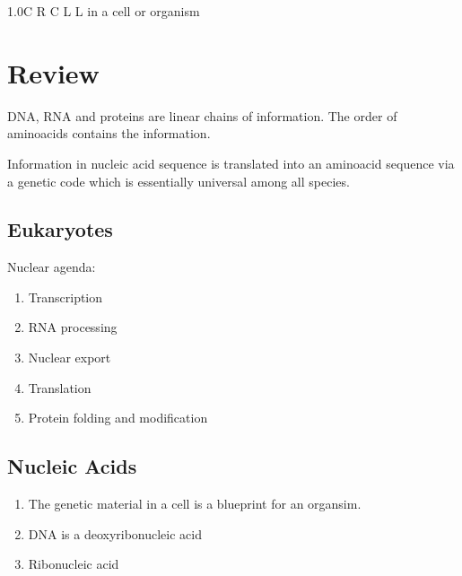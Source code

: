 \documentclass[11pt]{scrartcl}
\begin{document}
\begin{table*}[h]
\begin{tabulary}{1.0\textwidth}{C R C L L}
{                                                                                                                                                                                      in a cell or organism}\\
                                                                                                                                                                                    \toprule
                                                                                                                    \end{tabulary}
\end{table*}

\section{Review}

DNA, RNA and proteins are linear chains of
information. The order of aminoacids contains the information.

Information in nucleic acid sequence is translated into an aminoacid
sequence via a genetic code which is essentially universal among all
species.

\subsection{Eukaryotes}
Nuclear agenda:
\begin{enumerate}
\item\label{item:3} Transcription

\item\label{item:4} RNA processing

\item\label{item:5} Nuclear export

\item\label{item:6} Translation

\item\label{item:7} Protein folding and modification
\end{enumerate}

\subsection{Nucleic Acids}

\begin{enumerate}

\item\label{item:8} The genetic material in a cell is a blueprint for an organsim.

\item\label{item:9} DNA is a deoxyribonucleic acid

\item\label{item:10} Ribonucleic acid
\end{enumerate}
\end{document}
